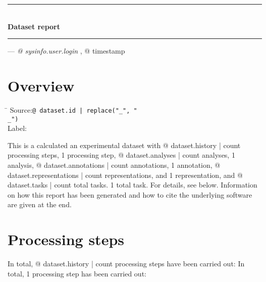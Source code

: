 

\rule[1ex]{\textwidth}{1pt}
\\[1em]
\textbf{\LARGE Dataset report}
\\[1ex]
\rule{\textwidth}{1pt}

\hfill --- \textsl{{@ sysinfo.user.login }}, {@ timestamp }

\section{Overview}

\begin{tabbing}
\hspace*{1.5cm}\=\kill
Source:\>\texttt{{@ dataset.id | replace("_", "\\_") }}
\\
Label:
\end{tabbing}

This is %
a calculated %
an experimental %
dataset with
{@ dataset.history | count } processing steps,
1 processing step,
{@ dataset.analyses | count } analyses,
1 analysis,
{@ dataset.annotations | count } annotations,
1 annotation,
{@ dataset.representations | count } representations, and
1 representation, and
{@ dataset.tasks | count } total tasks.
1 total task.
For details, see below. Information on how this report has been generated and how to cite the underlying software are given at the end.

\section{Processing steps}

In total, {@ dataset.history | count } processing steps have been carried out:
In total, 1 processing step has been carried out:

